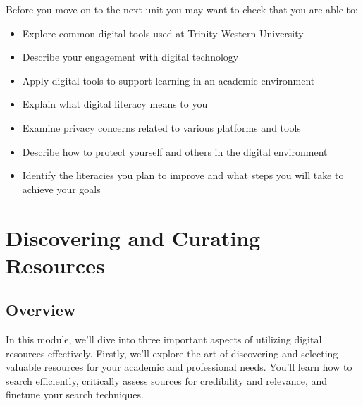 \documentclass[
  letterpaper,
  DIV=11,
  numbers=noendperiod]{scrreprt}
\providecommand{\tightlist}{%
  \setlength{\itemsep}{0pt}\setlength{\parskip}{0pt}}\usepackage{longtable,booktabs,array}
\begin{document}
\begin{tcolorbox}[enhanced jigsaw, toprule=.15mm, colback=white, colframe=quarto-callout-note-color-frame, bottomtitle=1mm, leftrule=.75mm, coltitle=black, titlerule=0mm, rightrule=.15mm, colbacktitle=quarto-callout-note-color!10!white, left=2mm, title={Checking Your Learning}, opacitybacktitle=0.6, opacityback=0, breakable, toptitle=1mm, arc=.35mm, bottomrule=.15mm]

Before you move on to the next unit you may want to check that you are
able to:

\begin{itemize}
\tightlist
\item
  Explore common digital tools used at Trinity Western University
\item
  Describe your engagement with digital technology
\item
  Apply digital tools to support learning in an academic environment
\item
  Explain what digital literacy means to you
\item
  Examine privacy concerns related to various platforms and tools
\item
  Describe how to protect yourself and others in the digital environment
\item
  Identify the literacies you plan to improve and what steps you will
  take to achieve your goals
\end{itemize}

\end{tcolorbox}


\chapter{Discovering and Curating
Resources}\label{discovering-and-curating-resources}

\section*{Overview}\label{overview-1}


In this module, we'll dive into three important aspects of utilizing
digital resources effectively. Firstly, we'll explore the art of
discovering and selecting valuable resources for your academic and
professional needs. You'll learn how to search efficiently, critically
assess sources for credibility and relevance, and finetune your search
techniques.
\end{document}
